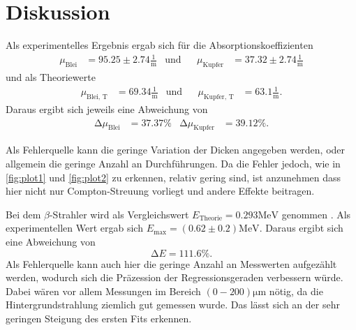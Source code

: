 \section{Diskussion}
\label{sec:Diskussion}

Als experimentelles Ergebnis ergab sich für die Absorptionskoeffizienten
\begin{align*}
    \mu_\text{Blei} &= 95.25 \pm 2.74 \frac{1}{\unit\meter}&\text{und}&&\mu_\text{Kupfer} &= 37.32 \pm 2.74 \frac{1}{\unit\meter}
\end{align*}
und als Theoriewerte 
\begin{align*}
    \mu_\text{Blei, T} &= 69.34 \frac{1}{\unit\meter}&\text{und}&&\mu_\text{Kupfer, T} &= 63.1 \frac{1}{\unit\meter}.
\end{align*} 
Daraus ergibt sich jeweils eine Abweichung von
\begin{align*}
    \increment \mu_\text{Blei} &= 37.37 \%&\increment \mu_\text{Kupfer} &= 39.12 \%.
\end{align*}

Als Fehlerquelle kann die geringe Variation der Dicken angegeben werden, oder allgemein die geringe Anzahl an Durchführungen.
Da die Fehler jedoch, wie in \autoref{fig:plot1} und \autoref{fig:plot2} zu erkennen, relativ gering sind, ist anzunehmen dass hier nicht nur Compton-Streuung vorliegt
und andere Effekte beitragen.


Bei dem $\beta$-Strahler wird als Vergleichswert $E_\text{Theorie} = 0.293 \unit{\mega\eV}$ genommen \cite{technetium99}.
Als experimentellen Wert ergab sich $E_\text{max} = (0.62 \pm 0.2) \unit{\mega\eV}$.
Daraus ergibt sich eine Abweichung von
\begin{equation*}
    \increment E = 111.6 \%.
\end{equation*}
Als Fehlerquelle kann auch hier die geringe Anzahl an Messwerten aufgezählt werden, wodurch sich die Präzession der Regressionsgeraden verbessern würde.
Dabei wären vor allem Messungen im Bereich $(0 - 200) \unit{\micro\meter}$ nötig, da die Hintergrundstrahlung ziemlich gut gemessen wurde.
Das lässt sich an der sehr geringen Steigung des ersten Fits erkennen.  